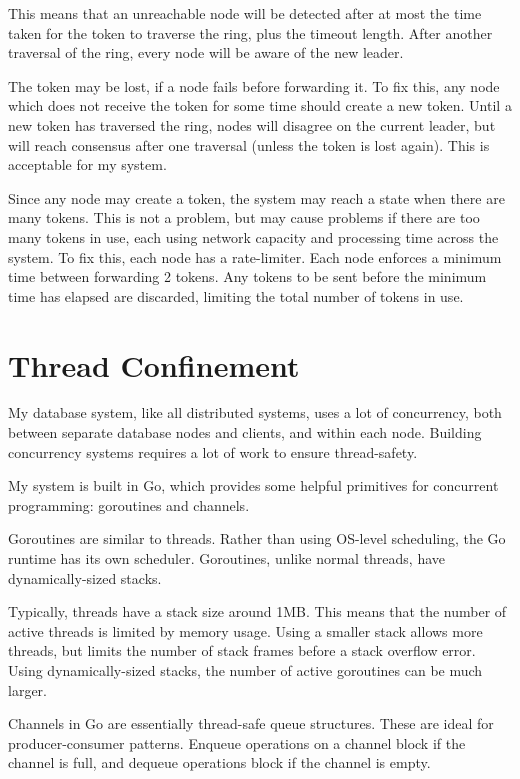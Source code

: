 \documentclass[12pt,a4paper,twoside,openright]{report}
\begin{document}

This means that an unreachable node will be detected after at most the time taken for the token to traverse the ring, plus the timeout length. After another traversal of the ring, every node will be aware of the new leader.

The token may be lost, if a node fails before forwarding it. To fix this, any node which does not receive the token for some time should create a new token. Until a new token has traversed the ring, nodes will disagree on the current leader, but will reach consensus after one traversal (unless the token is lost again). This is acceptable for my system.

Since any node may create a token, the system may reach a state when there are many tokens. This is not a problem, but may cause problems if there are too many tokens in use, each using network capacity and processing time across the system. To fix this, each node has a rate-limiter. Each node enforces a minimum time between forwarding 2 tokens. Any tokens to be sent before the minimum time has elapsed are discarded, limiting the total number of tokens in use.


\section{Thread Confinement}

My database system, like all distributed systems, uses a lot of concurrency, both between separate database nodes and clients, and within each node. Building concurrency systems requires a lot of work to ensure thread-safety.

My system is built in Go, which provides some helpful primitives for concurrent programming: goroutines and channels.

Goroutines are similar to threads. Rather than using OS-level scheduling, the Go runtime has its own scheduler. Goroutines, unlike normal threads, have dynamically-sized stacks.

Typically, threads have a stack size around 1MB. This means that the number of active threads is limited by memory usage. Using a smaller stack allows more threads, but limits the number of stack frames before a stack overflow error. Using dynamically-sized stacks, the number of active goroutines can be much larger.

Channels in Go are essentially thread-safe queue structures. These are ideal for producer-consumer patterns. Enqueue operations on a channel block if the channel is full, and dequeue operations block if the channel is empty.
\end{document}
